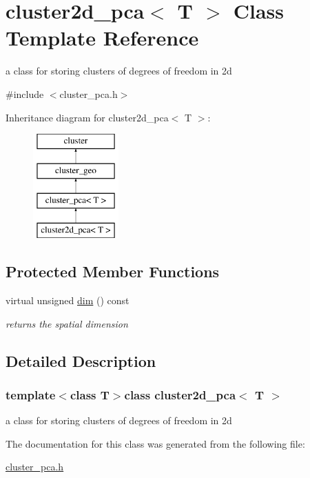 \hypertarget{classcluster2d__pca}{
\section{cluster2d\-\_\-pca$<$ \-T $>$ \-Class \-Template \-Reference}
\label{classcluster2d__pca}
}


a class for storing clusters of degrees of freedom in 2d  




{\ttfamily \#include $<$cluster\-\_\-pca.\-h$>$}

\-Inheritance diagram for cluster2d\-\_\-pca$<$ \-T $>$\-:\begin{figure}[H]
\begin{center}
\leavevmode
\includegraphics[height=4.000000cm]{classcluster2d__pca}
\end{center}
\end{figure}
\subsection*{\-Protected \-Member \-Functions}
\begin{DoxyCompactItemize}
\item 
\hypertarget{classcluster2d__pca_a70cb3c2ad43e60f7ff7908f8d063f99b}{
virtual unsigned \hyperlink{classcluster2d__pca_a70cb3c2ad43e60f7ff7908f8d063f99b}{dim} () const }
\label{classcluster2d__pca_a70cb3c2ad43e60f7ff7908f8d063f99b}

\begin{DoxyCompactList}\small\item\em returns the spatial dimension \end{DoxyCompactList}\end{DoxyCompactItemize}


\subsection{\-Detailed \-Description}
\subsubsection*{template$<$class \-T$>$class cluster2d\-\_\-pca$<$ T $>$}

a class for storing clusters of degrees of freedom in 2d 

\-The documentation for this class was generated from the following file\-:\begin{DoxyCompactItemize}
\item 
\hyperlink{cluster__pca_8h}{cluster\-\_\-pca.\-h}\end{DoxyCompactItemize}
